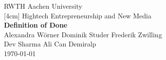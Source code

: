 \documentclass[twoside,12pt,a4paper]{article}
\begin{document}


\begin{titlepage}
 \begin{center}
  {\LARGE RWTH Aachen University}\\
  [4cm]
  {\Large Hightech Entrepreneurship and New Media \\[2cm]}
  {\huge\bf  Definition of Done \\[1.5cm]}
  {\large Alexandra Wörner \qquad
  		  Dominik Studer \qquad
  		  Frederik Zwilling \\ [0.15cm]
  		  Dev Sharma \qquad
  		  Ali Can Demiralp
  } \\[0.5cm]
  \today \\[2cm]
\bigskip



\end{center}

\end{titlepage}
\end{document}
